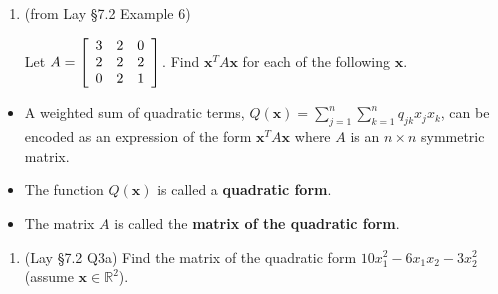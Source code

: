 \documentclass[12pt,letterpaper,noanswers]{exam}
\newcommand{\vc}[1]{\boldsymbol{#1}}
\begin{document}
\begin{enumerate}[resume=classQ]
    \item (from Lay \S 7.2 Example 6) 
    
    Let $A = \left[\begin{array}{c c c} 3 & 2 & 0 \\ 2 & 2 & 2 \\ 0 & 2 & 1 \end{array} \right]$. Find $\vc{x}^T A \vc{x}$ for each of the following $\vc{x}$.  
    
    
\end{enumerate}
\begin{tcolorbox}
\begin{itemize}
\itemsep0pt
    \item A weighted sum of quadratic terms, $Q(\vc{x}) = \sum\limits_{j=1}^n\sum\limits_{k=1}^n q_{jk}x_jx_k$, can be encoded as an expression of the form $\vc{x}^TA\vc{x}$ where $A$ is an $n\times n $ symmetric matrix.
    \item The function $Q(\vc{x})$ is called a \textbf{quadratic form}.
    \item 
The matrix $A$ is called the \textbf{matrix of the quadratic form}.
\end{itemize}
\end{tcolorbox}

\begin{enumerate}[resume=classQ]
    \item (Lay \S 7.2 Q3a) 
    Find the matrix of the quadratic form $10x_1^2 - 6x_1x_2 - 3x_2^2$ (assume $\vc{x}\in\mathbb{R}^2$).
\end{enumerate}
\end{document}

